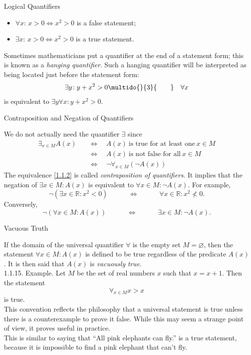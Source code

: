 \documentclass[smaller,hyperref={CJKbookmarks=true}]{beamer}
\newcommand{\R}{\mathbb{R}}
\begin{document}
\begin{frame}{Logical Quantifiers}
\begin{spacing}{1.05}
\begin{itemize}
  \item $\forall x\!:\,x>0\Leftrightarrow x^2>0$ is a false statement;
  \item $\exists x\!:\,x>0\Leftrightarrow x^2>0$ is a true statement.
\end{itemize}
Sometimes mathematicians put a quantifier at the end of a statement
form; this is known as a \emph{hanging quantifier}. Such a hanging quantifier will
be interpreted as being located just before the statement form:
\[\exists y\!:y+x^2>0\multido{}{3}{\qquad}\quad\forall x\]
is equivalent to $\exists y\forall x\!:y+x^2>0.$
\end{spacing}
\end{frame}
\begin{frame}[t]{Contraposition and Negation of Quantifiers}
\begin{spacing}{1.05}
We do not actually need the quantifier $\exists$ since
\begin{align}\label{1.1.2}
  \mathop{\exists}_{x\in M}A(x)\quad&\Leftrightarrow\quad A(x)~\text{is true for at least one}~x\in M\nonumber \\
   &\Leftrightarrow\quad A(x)~\text{is not false for all}~x\in M\nonumber \\
   &\Leftrightarrow\quad\neg\mathop{\forall}
   _{x\in M}(\neg A(x))
\end{align}
The equivalence \eqref{1.1.2} is called \emph{contraposition of quantifiers}. It implies that the negation of $\exists x\in M\!:A(x)$ is equivalent to $\forall x\in M\!:\neg A(x)$. For example,
\[\neg(\exists x\in\R\!:x^2<0)\qquad\quad\Leftrightarrow\qquad\quad
\forall x\in\R\!:x^2\nless0.\]
Conversely,
\[\neg(\forall x\in M\!:A(x))\qquad\quad\Leftrightarrow\qquad\quad
\exists x\in M\!:\neg A(x).\]
\end{spacing}
\end{frame}
\begin{frame}[c]{Vacuous Truth}
\begin{spacing}{1.1}
If the domain of the universal quantifier $\forall$ is the empty set $M=\varnothing$, then the statement $\forall x\in M\!:A(x)$ is defined to be true regardless of the predicate $A(x)$. It is then said that $A(x)$ is \emph{vacuously true}.\\[5pt]
\alert{1.1.15. Example.} Let $M$ be the set of real numbers $x$ such that $x=x+1$. Then the statement
\[\mathop{\forall}_{x\in M}x>x\]
is true.\\[5pt]
This convention reflects the philosophy that a universal statement is true
unless there is a counterexample to prove it false. While this may seem a
strange point of view, it proves useful in practice.\\[5pt]
This is similar to saying that ``All pink elephants can fly.'' is a true statement, because it is impossible to find a pink elephant that can't fly.
\end{spacing}
\end{frame}
\end{document}
